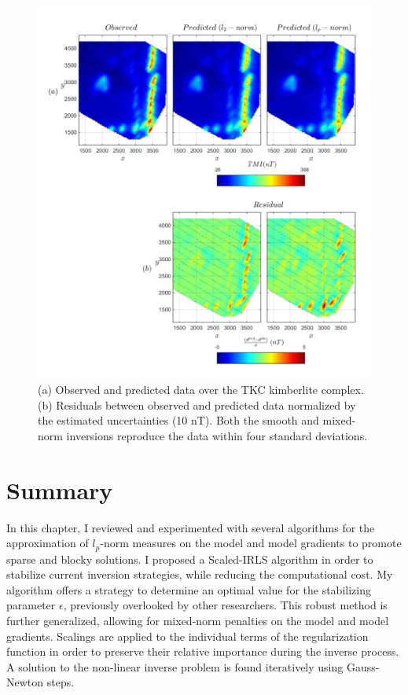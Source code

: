 \begin{figure}[p]
\centering
\includegraphics[scale=0.60]{TKC_Obs_vs_Pred.pdf}
\caption{(a) Observed and predicted data over the TKC kimberlite complex. (b) Residuals between observed and predicted data normalized by the estimated uncertainties (10 nT). Both the smooth and mixed-norm inversions reproduce the data within four standard deviations.}
\label{fig:TKC_Obs_vs_Pred}
\end{figure}


\section{Summary}
In this chapter, I reviewed and experimented with several algorithms for the approximation of $l_p$-norm measures on the model and model gradients to promote sparse and blocky solutions. 
I proposed a Scaled-IRLS algorithm in order to stabilize current inversion strategies, while reducing the computational cost. 
My algorithm offers a strategy to determine an optimal value for the stabilizing parameter $\epsilon$, previously overlooked by other researchers. This robust method is further generalized, allowing for mixed-norm penalties on the model and model gradients. Scalings are applied to the individual terms of the regularization function in order to preserve their relative importance during the inverse process. 
A solution to the non-linear inverse problem is found iteratively using Gauss-Newton steps. 

